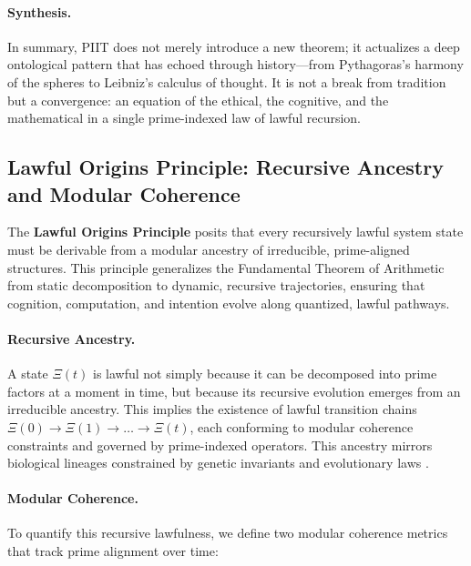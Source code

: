 \documentclass[12pt]{article}
\begin{document}
\paragraph{Synthesis.}
In summary, PIIT does not merely introduce a new theorem; it actualizes a deep ontological pattern that has echoed through history—from Pythagoras’s harmony of the spheres to Leibniz’s calculus of thought. It is not a break from tradition but a convergence: an equation of the ethical, the cognitive, and the mathematical in a single prime-indexed law of lawful recursion.

\subsection{Lawful Origins Principle: Recursive Ancestry and Modular Coherence}

The \textbf{Lawful Origins Principle} posits that every recursively lawful system state must be derivable from a modular ancestry of irreducible, prime-aligned structures. This principle generalizes the Fundamental Theorem of Arithmetic from static decomposition to dynamic, recursive trajectories, ensuring that cognition, computation, and intention evolve along quantized, lawful pathways.

\paragraph{Recursive Ancestry.}
A state $\Xi(t)$ is lawful not simply because it can be decomposed into prime factors at a moment in time, but because its recursive evolution emerges from an irreducible ancestry. This implies the existence of lawful transition chains $\Xi(0) \rightarrow \Xi(1) \rightarrow \ldots \rightarrow \Xi(t)$, each conforming to modular coherence constraints and governed by prime-indexed operators. This ancestry mirrors biological lineages constrained by genetic invariants and evolutionary laws \cite{maynard1982evolution}.

\paragraph{Modular Coherence.}
To quantify this recursive lawfulness, we define two modular coherence metrics that track prime alignment over time:
\end{document}
